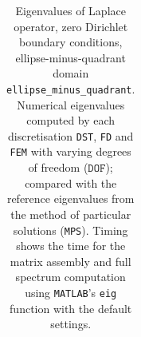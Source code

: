 \begin{table}[htbp]
{{\begin{tabular}{lrrrrrrrrrrrr}
    \bottomrule
  \end{tabular}}}
  \caption{Eigenvalues of Laplace operator, zero Dirichlet boundary conditions, ellipse-minus-quadrant domain \texttt{ellipse\_minus\_quadrant}. Numerical eigenvalues computed by each discretisation \texttt{DST}, \texttt{FD} and \texttt{FEM} with varying degrees of freedom ($\mathtt{DOF}$); compared with the reference eigenvalues from the method of particular solutions (\texttt{MPS}). Timing shows the time for the matrix assembly and full spectrum computation using \texttt{MATLAB}'s \lstinline{eig} function with the default settings.}
  \label{tab:eigenvalues_head_ellipse_minus_quadrant_transposed}
\end{table}
